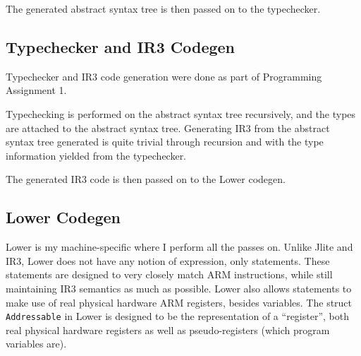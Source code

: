 \documentclass[nonacm, acmsmall, screen, 10pt]{acmart}
\begin{document}
The generated abstract syntax tree is then passed on to the typechecker.

\subsection{Typechecker and IR3 Codegen}
Typechecker and IR3 code generation were done as part of Programming Assignment 1.

Typechecking is performed on the abstract syntax tree recursively, and the types are attached to the abstract syntax tree.
Generating IR3 from the abstract syntax tree generated is quite trivial through recursion and with the type information yielded from the typechecker.

The generated IR3 code is then passed on to the Lower codegen.

\subsection{Lower Codegen}
Lower is my machine-specific where I perform all the passes on.
Unlike Jlite and IR3, Lower does not have any notion of expression, only statements.
These statements are designed to very closely match ARM instructions, while still maintaining IR3 semantics as much as possible.
Lower also allows statements to make use of real physical hardware ARM registers, besides variables.
The struct \texttt{Addressable} in Lower is designed to be the representation of a ``register'', both real physical hardware registers as well as pseudo-registers (which program variables are).
\end{document}
